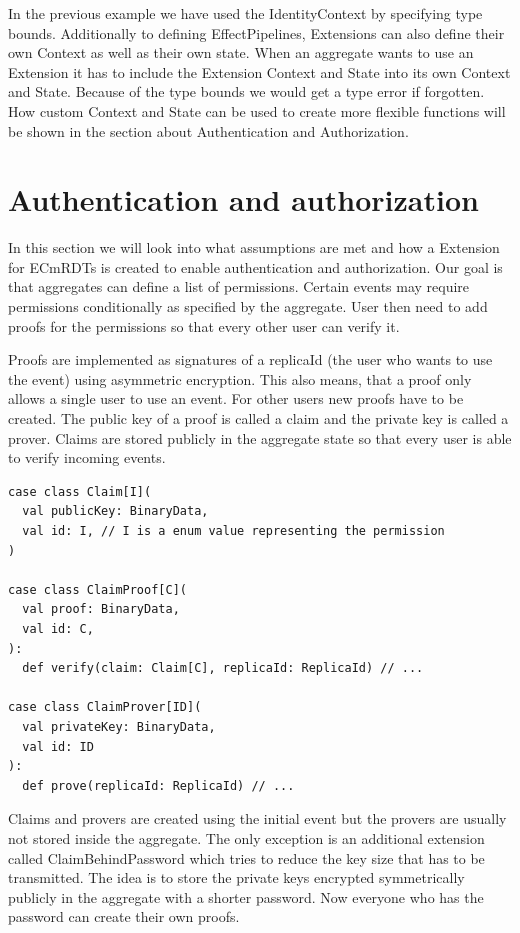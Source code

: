 \documentclass[
	ngerman,
	ruledheaders=section,   %
	class=report,		    %
	thesis={type=bachelor}, %
	accentcolor=9c,			%
	custommargins=true,    %
	marginpar=false,        %
	parskip=half-,          %
	fontsize=11pt,          %
]{tudapub}
\begin{document}
In the previous example we have used the IdentityContext by specifying type bounds. Additionally to defining EffectPipelines, Extensions can also define their own Context as well as their own state. When an aggregate wants to use an Extension it has to include the Extension Context and State into its own Context and State. Because of the type bounds we would get a type error if forgotten. How custom Context and State can be used to create more flexible functions will be shown in the section about Authentication and Authorization.

\section{Authentication and authorization}
In this section we will look into what assumptions are met and how a Extension for ECmRDTs is created to enable authentication and authorization. Our goal is that aggregates can define a list of permissions. Certain events may require permissions conditionally as specified by the aggregate. User then need to add proofs for the permissions so that every other user can verify it. 

Proofs are implemented as signatures of a replicaId (the user who wants to use the event) using asymmetric encryption. This also means, that a proof only allows a single user to use an event. For other users new proofs have to be created. The public key of a proof is called a claim and the private key is called a prover. Claims are stored publicly in the aggregate state so that every user is able to verify incoming events.

\begin{lstlisting}
case class Claim[I](
  val publicKey: BinaryData,
  val id: I, // I is a enum value representing the permission
)

case class ClaimProof[C](
  val proof: BinaryData,
  val id: C,
):
  def verify(claim: Claim[C], replicaId: ReplicaId) // ...

case class ClaimProver[ID](
  val privateKey: BinaryData,
  val id: ID
):
  def prove(replicaId: ReplicaId) // ...

\end{lstlisting}

Claims and provers are created using the initial event but the provers are usually not stored inside the aggregate. The only exception is an additional extension called ClaimBehindPassword which tries to reduce the key size that has to be transmitted. The idea is to store the private keys encrypted symmetrically publicly in the aggregate with a shorter password. Now everyone who has the password can create their own proofs.
\end{document}
